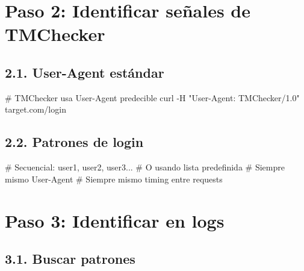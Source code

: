 \documentclass[
  letterpaper,
]{report}
\newenvironment{Shaded}{\begin{snugshade}}{\end{snugshade}}
\newcommand{\AttributeTok}[1]{\textcolor[rgb]{0.40,0.45,0.13}{#1}}
\newcommand{\CommentTok}[1]{\textcolor[rgb]{0.37,0.37,0.37}{#1}}
\newcommand{\ExtensionTok}[1]{\textcolor[rgb]{0.00,0.23,0.31}{#1}}
\newcommand{\FunctionTok}[1]{\textcolor[rgb]{0.28,0.35,0.67}{#1}}
\newcommand{\KeywordTok}[1]{\textcolor[rgb]{0.00,0.23,0.31}{\textbf{#1}}}
\newcommand{\NormalTok}[1]{\textcolor[rgb]{0.00,0.23,0.31}{#1}}
\newcommand{\StringTok}[1]{\textcolor[rgb]{0.13,0.47,0.30}{#1}}
\begin{document}
\section{Paso 2: Identificar señales de
TMChecker}\label{paso-2-identificar-seuxf1ales-de-tmchecker}

\subsection{2.1. User-Agent estándar}\label{user-agent-estuxe1ndar}

\begin{Shaded}
\begin{Highlighting}[]
\CommentTok{\# TMChecker usa User{-}Agent predecible}
\ExtensionTok{curl} \AttributeTok{{-}H} \StringTok{"User{-}Agent: TMChecker/1.0"}\NormalTok{ target.com/login}
\end{Highlighting}
\end{Shaded}

\subsection{2.2. Patrones de login}\label{patrones-de-login}

\begin{Shaded}
\begin{Highlighting}[]
\CommentTok{\# Secuencial: user1, user2, user3...}
\CommentTok{\# O usando lista predefinida}
\CommentTok{\# Siempre mismo User{-}Agent}
\CommentTok{\# Siempre mismo timing entre requests}
\end{Highlighting}
\end{Shaded}

\section{Paso 3: Identificar en logs}\label{paso-3-identificar-en-logs}

\subsection{3.1. Buscar patrones}\label{buscar-patrones}

\begin{Shaded}
\end{Shaded}
\end{document}
